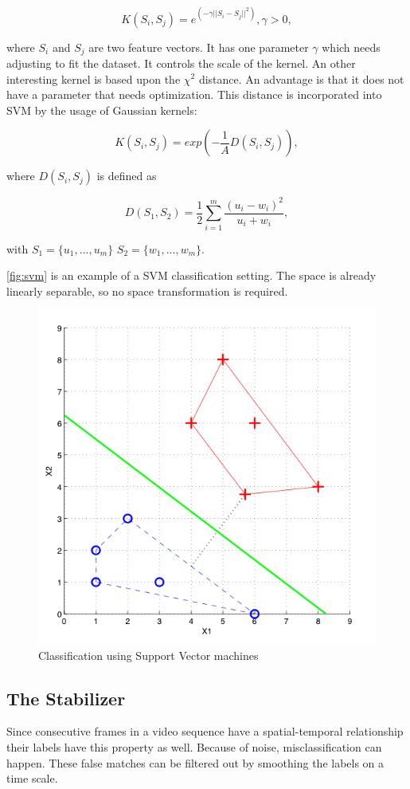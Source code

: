 \begin{equation}
	K(S_i,S_j) = e^{(-\gamma||S_i-S_j||^2)}, \gamma > 0,
\end{equation}

where $S_i$ and $S_j$ are two feature vectors. It has one parameter $\gamma$ which needs adjusting to fit the dataset. It controls the scale of the kernel. An other interesting kernel is based upon the $\chi^2$ distance\citep{Zhang2007}. An advantage is that it does not have a parameter that needs optimization. This distance is incorporated into SVM by the usage of Gaussian kernels\citep{Chapelle1999}:

\begin{equation}
	K(S_i,S_j) = exp(-\frac{1}{A}D(S_i,S_j)),
\end{equation}

where $D(S_i,S_j)$ is defined as

\begin{equation}
	D(S_1,S_2) = \frac{1}{2}\sum^{m}_{i=1}\frac{(u_i-w_i)^2}{u_i+w_i},
\end{equation}

with $S_1 = \{u_1, ... , u_m\}$ $S_2 = \{w_1, ... , w_m\}$.

\autoref{fig:svm} is an example of a SVM classification setting. The space is already linearly separable, so no space transformation is required. 

\begin{figure}[tb]
\center{}
\includegraphics[width=0.5\linewidth]{figures/svm2.png}
\caption{Classification using Support Vector machines}
\label{fig:svm}
\end{figure}




\subsection*{The Stabilizer}
\label{subsec:stabilizer}
Since consecutive frames in a video sequence have a spatial-temporal relationship their labels have this property as well. Because of noise, misclassification can happen. These false matches can be filtered out by smoothing the labels on a time scale.

